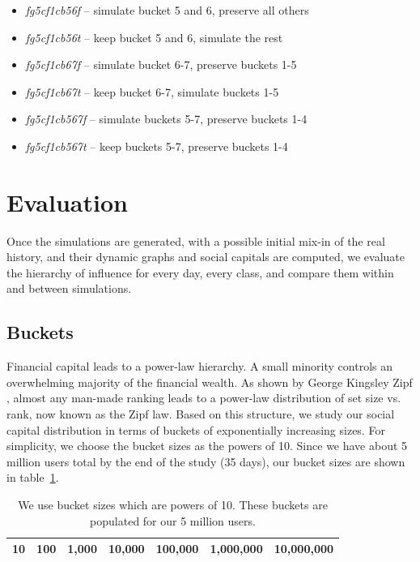 \documentclass[10pt,oneside]{memoir}
\begin{document}
\begin{Spacing}{2}
\begin{itemize}
\item {\itshape fg5cf1c{\itshape {\itshape b56f}}} -- simulate bucket 5 and 6, preserve all others

\item {\itshape fg5cf1c{\itshape {\itshape b56t}}} -- keep bucket 5 and 6, simulate the rest

\item {\itshape fg5cf1c{\itshape {\itshape b67f}}} -- simulate bucket 6-7, preserve buckets 1-5

\item {\itshape fg5cf1c{\itshape {\itshape b67t}}} -- keep bucket 6-7, simulate buckets 1-5

\item {\itshape fg5cf1c{\itshape {\itshape b567f}}} -- simulate buckets 5-7, preserve buckets 1-4

\item {\itshape fg5cf1c{\itshape {\itshape b567t}}} -- keep buckets 5-7, preserve buckets 1-4
\end{itemize}

\pagebreak \section{Evaluation}
\label{evaluation}

Once the simulations are generated, with a possible initial mix-in of the real history, and their dynamic graphs and social capitals are computed, we evaluate the hierarchy of influence for every day, every class, and compare them within and between simulations.


\subsection{Buckets}
\label{buckets}

Financial capital leads to a power-law hierarchy.  A small minority controls an overwhelming majority of the financial wealth.  As shown by George Kingsley Zipf \cite{zipf1949humanbehavior}, almost any man-made ranking leads to a power-law distribution of set size vs. rank, now known as the Zipf law.  Based on this structure, we study our social capital distribution in terms of buckets of exponentially increasing sizes.
For simplicity, we choose the bucket sizes as the powers of 10.  Since we have about 5 million users total by the end of the study (35 days), our bucket sizes are shown in table~\ref{table:bucket-sizes}.

\begin{table}
\begin{tabular}{|ccccccc|}
\toprule
10 & 100 & 1,000 & 10,000 & 100,000 & 1,000,000 & 10,000,000 \\
\bottomrule
\end{tabular}
\label{table:bucket-sizes}
\caption{We use bucket sizes which are powers of 10.  These buckets are populated for our 5 million users.}
\end{table}


\end{Spacing}
\end{document}
